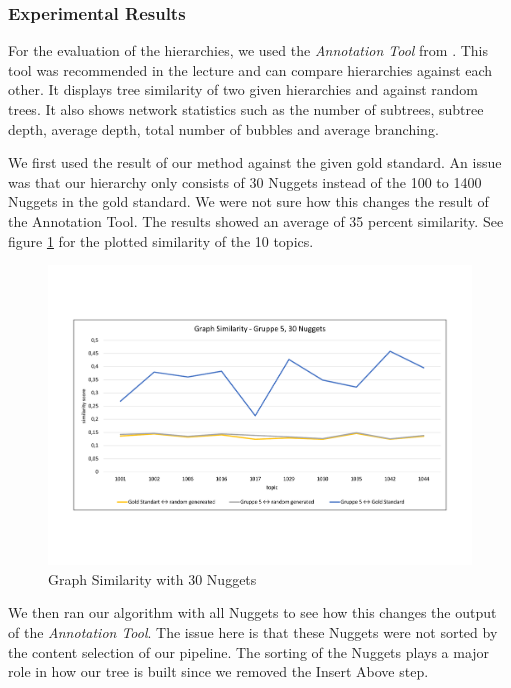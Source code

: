 \subsubsection{Experimental Results}

For the evaluation of the hierarchies, we used the \textit{Annotation Tool} from \cite{Tauchmann.et.al.2018.LREC}. This tool was recommended in the lecture and can compare hierarchies against each other. It displays tree similarity of two given hierarchies and against random trees. It also shows network statistics such as the number of subtrees, subtree depth, average depth, total number of bubbles and average branching.

We first used the result of our method against the given gold standard. An issue was that our hierarchy only consists of 30 Nuggets instead of the 100 to 1400 Nuggets in the gold standard. We were not sure how this changes the result of the Annotation Tool. The results showed an average of 35 percent similarity. See figure \ref{fig:graph30} for the plotted similarity of the 10 topics.

\begin{figure}[H]
	\centering
	\includegraphics[trim= 0 130 0 130,width=\textwidth]{img/sim_v1.pdf}
	\caption{Graph Similarity with 30 Nuggets}
	\label{fig:graph30}
\end{figure}

We then ran our algorithm with all Nuggets to see how this changes the output of the \textit{Annotation Tool}. The issue here is that these Nuggets were not sorted by the content selection of our pipeline. The sorting of the Nuggets plays a major role in how our tree is built since we removed the Insert Above step.

